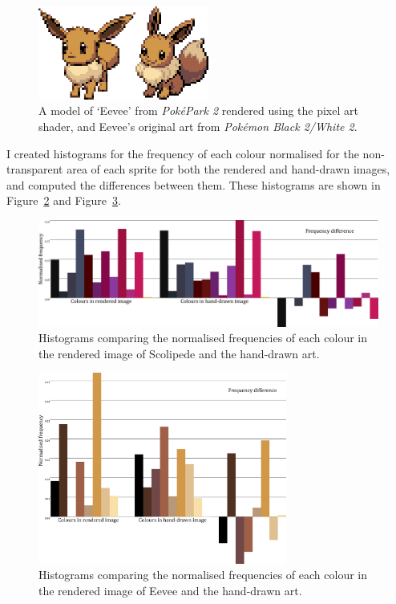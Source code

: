 \documentclass[12pt,twoside,notitlepage]{report}
\begin{document}
\begin{figure}[h!]
\centering
\includegraphics[width=0.5\textwidth]{eeveecomparison}
\caption{A model of `Eevee' from \textit{Pok\'{e}Park 2} rendered using the pixel art shader, and Eevee's original art from \textit{Pok\'{e}mon Black 2/White 2}.}
\label{fig:eeveecomparison}
\end{figure}

I created histograms for the frequency of each colour normalised for the non-transparent area of each sprite for both the rendered and hand-drawn images, and computed the differences between them. These histograms are shown in Figure~\ref{fig:scolipedehistogram} and Figure~\ref{fig:eeveehistogram}.

\begin{figure}[h!]
\centering
\includegraphics[width=\textwidth]{histogram1}
\caption{Histograms comparing the normalised frequencies of each colour in the rendered image of Scolipede and the hand-drawn art.}
\label{fig:scolipedehistogram}
\end{figure}

\begin{figure}[h!]
\centering
\includegraphics[width=0.728\textwidth]{histogram2}
\caption{Histograms comparing the normalised frequencies of each colour in the rendered image of Eevee and the hand-drawn art.}
\label{fig:eeveehistogram}
\end{figure}
\end{document}
